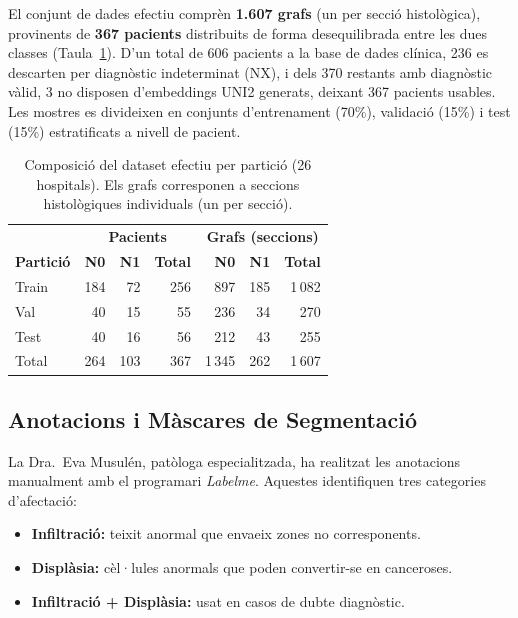 \documentclass[10pt,a4paper,twocolumn,twoside]{article}
\begin{document}
El conjunt de dades efectiu comprèn \textbf{1.607 grafs} (un per secció histològica), provinents de
\textbf{367 pacients} distribuits de forma desequilibrada entre les dues classes
(Taula~\ref{tab:dataset}). D'un total de 606 pacients a la base de dades clínica, 236 es descarten
per diagnòstic indeterminat (NX), i dels 370 restants amb diagnòstic vàlid, 3 no disposen
d'embeddings UNI2 generats, deixant 367 pacients usables. Les mostres es divideixen en conjunts
d'entrenament (70\%), validació (15\%) i test (15\%) estratificats a nivell de pacient.

\begin{table}[t]
\centering
\caption{Composició del dataset efectiu per partició (26 hospitals).
Els grafs corresponen a seccions histològiques individuals (un per secció).}
\label{tab:dataset}
\small
\begin{tabular}{lrrr|rrr}
\toprule
 & \multicolumn{3}{c|}{\textbf{Pacients}} & \multicolumn{3}{c}{\textbf{Grafs (seccions)}} \\
\textbf{Partició} & \textbf{N0} & \textbf{N1} & \textbf{Total} & \textbf{N0} & \textbf{N1} & \textbf{Total} \\
\midrule
Train & 184 &  72 & 256 &   897 & 185 & 1\,082 \\
Val   &  40 &  15 &  55 &   236 &  34 &   270  \\
Test  &  40 &  16 &  56 &   212 &  43 &   255  \\
\midrule
Total & 264 & 103 & 367 & 1\,345 & 262 & 1\,607 \\
\bottomrule
\end{tabular}
\end{table}

\subsection{Anotacions i Màscares de Segmentació}

La Dra.\ Eva Musulén, patòloga especialitzada, ha realitzat les anotacions manualment amb el programari
\textit{Labelme}. Aquestes identifiquen tres categories d'afectació:

\begin{itemize}
    \item \textbf{Infiltració:} teixit anormal que envaeix zones no corresponents.
    \item \textbf{Displàsia:} cèl·lules anormals que poden convertir-se en canceroses.
    \item \textbf{Infiltració + Displàsia:} usat en casos de dubte diagnòstic.
\end{itemize}
\end{document}
